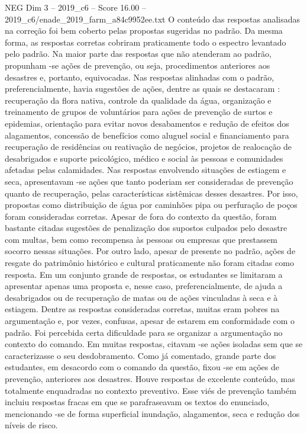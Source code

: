 \begin{textsample}{NEG Dim 3 – 2019\_c6 – Score 16.00 – 2019\_c6/enade\_2019\_farm\_a84c9952ee.txt}
O conteúdo das respostas analisadas na correção foi bem coberto pelas propostas sugeridas no padrão.
Da mesma forma, as respostas corretas cobriram praticamente todo o espectro levantado pelo padrão.
Na maior parte das respostas que não atenderam ao padrão, propunham -se ações de prevenção, ou seja, procedimentos anteriores aos desastres e, portanto, equivocadas.
Nas respostas alinhadas com o padrão, preferencialmente, havia sugestões de ações, dentre as quais se destacaram : recuperação da flora nativa, controle da qualidade da água, organização e treinamento de grupos de voluntários para ações de prevenção de surtos e epidemias, orientação para evitar novos desabamentos e redução de efeitos dos alagamentos, concessão de benefícios como aluguel social e financiamento para recuperação de residências ou reativação de negócios, projetos de realocação de desabrigados e suporte psicológico, médico e social às pessoas e comunidades afetadas pelas calamidades.
Nas respostas envolvendo situações de estiagem e seca, apresentavam -se ações que tanto poderiam ser consideradas de prevenção quanto de recuperação, pelas características sistêmicas desses desastres.
Por isso, propostas como distribuição de água por caminhões pipa ou perfuração de poços foram consideradas corretas.
Apesar de fora do contexto da questão, foram bastante citadas sugestões de penalização dos supostos culpados pelo desastre com multas, bem como recompensa às pessoas ou empresas que prestassem socorro nessas situações.
Por outro lado, apesar de presente no padrão, ações de resgate do patrimônio histórico e cultural praticamente não foram citadas como resposta.
Em um conjunto grande de respostas, os estudantes se limitaram a apresentar apenas uma proposta e, nesse caso, preferencialmente, de ajuda a desabrigados ou de recuperação de matas ou de ações vinculadas à seca e à estiagem.
Dentre as respostas consideradas corretas, muitas eram pobres na argumentação e, por vezes, confusas, apesar de estarem em conformidade com o padrão.
Foi percebida certa dificuldade para se organizar a argumentação no contexto do comando.
Em muitas respostas, citavam -se ações isoladas sem que se caracterizasse o seu desdobramento.
Como já comentado, grande parte dos estudantes, em desacordo com o comando da questão, fixou -se em ações de prevenção, anteriores aos desastres.
Houve respostas de excelente conteúdo, mas totalmente enquadradas no contexto preventivo.
Esse viés de prevenção também incluiu respostas fracas em que se parafraseavam os textos do enunciado, mencionando -se de forma superficial inundação, alagamentos, seca e redução dos níveis de risco.

\end{textsample}

